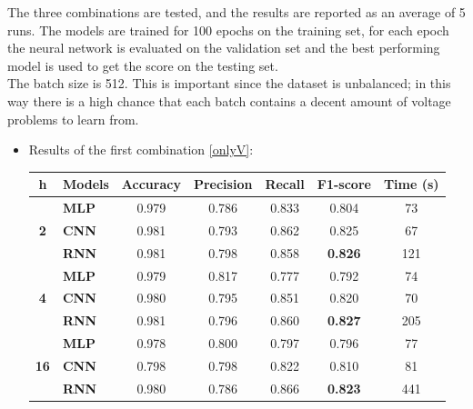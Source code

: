 The three combinations are tested, and the results are reported as an average of 5 runs. The models are trained for 100 epochs on the training set, for each epoch the neural network is evaluated on the validation set and the best performing model is used to get the score on the testing set.\\
The batch size is 512. This is important since the dataset is unbalanced; in this way there is a high chance that each batch contains a decent amount of voltage problems to learn from.
\begin{itemize}
    \item Results of the first combination \ref{onlyV}:
    
    \begin{table}[H]
    \centering
    \begin{tabular}{|c|l|c|c|c|c|c|}
    \hline
    \textbf{h} &
      \textbf{Models} &
      \multicolumn{1}{l|}{\textbf{Accuracy}} &
      \multicolumn{1}{l|}{\textbf{Precision}} &
      \multicolumn{1}{l|}{\textbf{Recall}} &
      \multicolumn{1}{l|}{\textbf{F1-score}} &
      \multicolumn{1}{l|}{\textbf{Time (s)}} \\ \hline
    \multirow{3}{*}{\textbf{2}}  & \textbf{MLP} & 0.979 & 0.786 & 0.833 & 0.804                           & 73  \\ \cline{2-7} 
                        & \textbf{CNN} & 0.981 & 0.793 & 0.862 & 0.825                           & 67  \\ \cline{2-7} 
                        & \textbf{RNN} & 0.981 & 0.798 & 0.858 & \textbf{0.826} & 121 \\ \hline
    \multirow{3}{*}{\textbf{4}}  & \textbf{MLP} & 0.979 & 0.817 & 0.777 & 0.792                           & 74  \\ \cline{2-7} 
                        & \textbf{CNN} & 0.980 & 0.795 & 0.851 & 0.820                           & 70  \\ \cline{2-7} 
                        & \textbf{RNN} & 0.981 & 0.796 & 0.860 & \textbf{0.827} & 205 \\ \hline
    \multirow{3}{*}{\textbf{16}} & \textbf{MLP} & 0.978 & 0.800 & 0.797 & 0.796                           & 77  \\ \cline{2-7} 
                        & \textbf{CNN} & 0.798 & 0.798 & 0.822 & 0.810                           & 81  \\ \cline{2-7} 
                        & \textbf{RNN} & 0.980 & 0.786 & 0.866 & \textbf{0.823} & 441 \\ \hline

\end{tabular}
\end{table}
\end{itemize}
